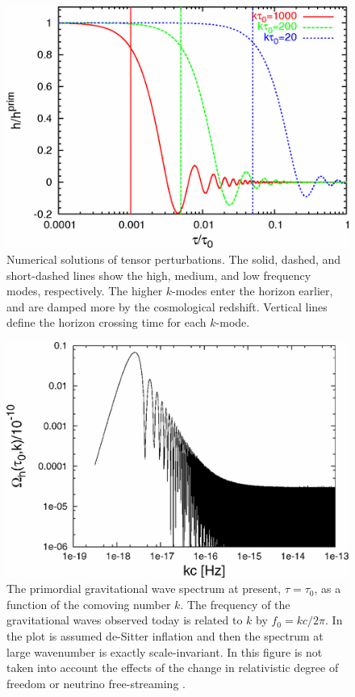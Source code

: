 \documentclass[11pt,a4paper,twoside]{book}
\begin{document}
\begin{figure}
	\centering
	\includegraphics[width=0.7\linewidth, height=0.25\textheight]{Images/Chap3/Watanabe_Komatsu_Fig6}
	\caption{Numerical solutions of tensor perturbations. The solid, dashed, and short-dashed lines show the high, medium, and low frequency modes, respectively. The higher $k$-modes enter the horizon earlier, and are damped more by the cosmological redshift. Vertical lines define the horizon crossing time for each $ k $-mode\cite{Chap3:GW_Watanabe_Komatsu}.}
	\label{fig:watanabekomatsufig6}
\end{figure}

\begin{figure}
	\centering
	\includegraphics[width=0.7\linewidth, height=0.25\textheight]{Images/Chap3/Watanabe_Komatsu_Fig1}
	\caption{The primordial gravitational wave spectrum at present, $\tau=\tau_{0}$, as a function of the comoving number $ k $. The frequency of the gravitational waves observed today is related to $ k $ by $ f_{0}=kc/2\pi $. In the plot is assumed de-Sitter inflation and then the spectrum at large wavenumber is exactly scale-invariant. In this figure is not taken into account the effects of the change in relativistic degree of freedom or neutrino free-streaming \cite{Chap3:GW_Watanabe_Komatsu}.}
	\label{fig:watanabekomatsufig1}
\end{figure}
\end{document}
